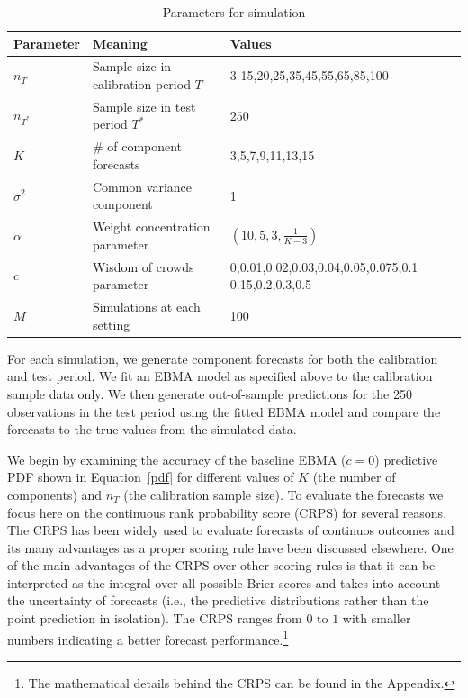 \documentclass[12pt,fullpage,endnotes]{article}
\begin{document}
\begin{table}
  \caption{Parameters for simulation}
\label{params}
\small
\centering

\vspace{.2cm}
\begin{tabular}{lll}
  \toprule
  Parameter & Meaning & Values \\
  \midrule
  $n_{T}$ & Sample size in calibration period $T$  & 3-15,20,25,35,45,55,65,85,100 \\
  $n_{T^\ast}$ &  Sample size in test period $T^\ast$&$250$\\
  $K$ & \# of component forecasts & 3,5,7,9,11,13,15\\
  $\sigma^2$ & Common variance component & 1 \\
  $\alpha$ & Weight concentration parameter  &$ (10, 5, 3, \frac{1}{K-3})$ \\
 $c$ & Wisdom of crowds parameter & 0,0.01,0.02,0.03,0.04,0.05,0.075,0.1 0.15,0.2,0.3,0.5\\
  $M$ & Simulations at each setting & 100 \\
  \bottomrule
\end{tabular}
\end{table}

For each simulation, we generate component forecasts for both the
calibration and test period. We fit an EBMA model as specified above
to the calibration sample data only. We then generate out-of-sample
predictions for the 250 observations in the test period using the
fitted EBMA model and compare the forecasts to the true values from the
simulated data.  

We begin by examining the accuracy of the baseline EBMA ($c=0$)
predictive PDF shown in Equation~\ref{pdf} for different values of $K$
(the number of components) and $n_{T}$ (the calibration sample size).
To evaluate the forecasts we focus here on the continuous rank
probability score (CRPS) for several reasons. The CRPS has been widely
used to evaluate forecasts of continuos outcomes and its many
advantages as a proper scoring rule have been discussed
elsewhere\citep{Hersbach:2000,Gneiting_Raftery_2007,GneitingEtAl:2007,brandt:freeman:schrodt:2011}. One
of the main advantages of the CRPS over other scoring rules is that it
can be interpreted as the integral over all possible Brier scores
\citep{Brier:1950} and takes into account the uncertainty of forecasts
(i.e., the predictive distributions rather than the point prediction
in isolation). The CRPS ranges from $0$ to $1$ with smaller numbers
indicating a better forecast performance.\footnote{The mathematical
  details behind the CRPS can be found in the Appendix.}
\end{document}

